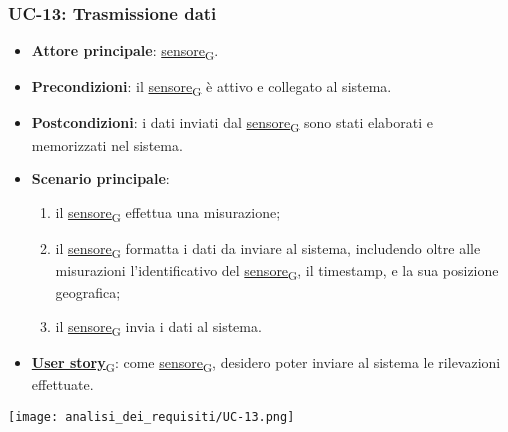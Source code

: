 \subsubsection{UC-13: Trasmissione dati}
\begin{itemize}
	\item \textbf{Attore principale}: \href{https://7last.github.io/docs/rtb/documentazione-interna/glossario\#sensore}{sensore\textsubscript{G}}.
	\item \textbf{Precondizioni}: il \href{https://7last.github.io/docs/rtb/documentazione-interna/glossario\#sensore}{sensore\textsubscript{G}} è attivo e collegato al sistema.
	\item \textbf{Postcondizioni}: i dati inviati dal \href{https://7last.github.io/docs/rtb/documentazione-interna/glossario\#sensore}{sensore\textsubscript{G}} sono stati elaborati e memorizzati nel sistema.
	\item \textbf{Scenario principale}:
	      \begin{enumerate}
		      \item il \href{https://7last.github.io/docs/rtb/documentazione-interna/glossario\#sensore}{sensore\textsubscript{G}} effettua una misurazione;
		      \item il \href{https://7last.github.io/docs/rtb/documentazione-interna/glossario\#sensore}{sensore\textsubscript{G}} formatta i dati da inviare al sistema, includendo oltre alle misurazioni l'identificativo del \href{https://7last.github.io/docs/rtb/documentazione-interna/glossario\#sensore}{sensore\textsubscript{G}},
		            il timestamp, e la sua posizione geografica;
		      \item il \href{https://7last.github.io/docs/rtb/documentazione-interna/glossario\#sensore}{sensore\textsubscript{G}} invia i dati al sistema.
	      \end{enumerate}
	\item \href{https://7last.github.io/docs/rtb/documentazione-interna/glossario\#user-story}{\textbf{User story}\textsubscript{G}}: come \href{https://7last.github.io/docs/rtb/documentazione-interna/glossario\#sensore}{sensore\textsubscript{G}}, desidero poter inviare al sistema le rilevazioni effettuate.
\end{itemize}

\begin{center}
	\texttt{[image: analisi\_dei\_requisiti/UC-13.png]}
\end{center}


